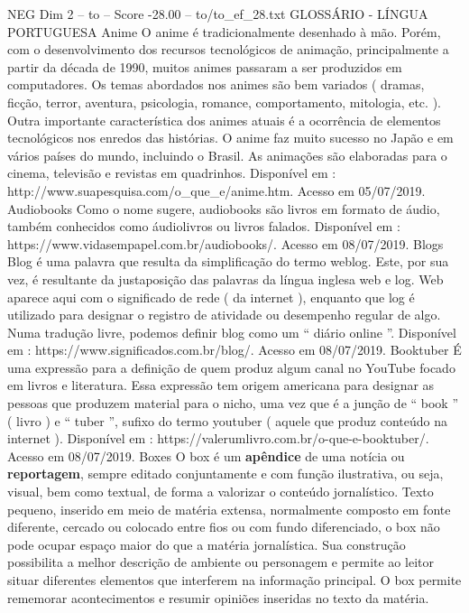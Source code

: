 \begin{textsample}{NEG Dim 2 – to – Score -28.00 – to/to\_ef\_28.txt}  \label{ex:f2_neg_151}
GLOSSÁRIO - LÍNGUA PORTUGUESA Anime O anime é tradicionalmente desenhado à mão.
Porém, com o desenvolvimento dos recursos tecnológicos de animação, principalmente a partir da década de 1990, muitos animes passaram a ser produzidos em computadores.
Os temas abordados nos animes são bem variados ( dramas, ficção, terror, aventura, psicologia, romance, comportamento, mitologia, etc. ).
Outra importante característica dos animes atuais é a ocorrência de elementos tecnológicos nos enredos das histórias.
O anime faz muito sucesso no Japão e em vários países do mundo, incluindo o Brasil.
As animações são elaboradas para o cinema, televisão e revistas em quadrinhos.
Disponível em : http://www.suapesquisa.com/o\_que\_e/anime.htm.
Acesso em 05/07/2019.
Audiobooks Como o nome sugere, audiobooks são livros em formato de áudio, também conhecidos como áudiolivros ou livros falados.
Disponível em : https://www.vidasempapel.com.br/audiobooks/.
Acesso em 08/07/2019.
Blogs Blog é uma palavra que resulta da simplificação do termo weblog.
Este, por sua vez, é resultante da justaposição das palavras da língua inglesa web e log.
Web aparece aqui com o significado de rede ( da internet ), enquanto que log é utilizado para designar o registro de atividade ou desempenho regular de algo.
Numa tradução livre, podemos definir blog como um “ diário online ”.
Disponível em : https://www.significados.com.br/blog/.
Acesso em 08/07/2019.
Booktuber É uma expressão para a definição de quem produz algum canal no YouTube focado em livros e literatura.
Essa expressão tem origem americana para designar as pessoas que produzem material para o nicho, uma vez que é a junção de “ book ” ( livro ) e “ tuber ”, sufixo do termo youtuber ( aquele que produz conteúdo na internet ).
Disponível em : https://valerumlivro.com.br/o-que-e-booktuber/.
Acesso em 08/07/2019.
Boxes O box é um \textbf{apêndice} de uma notícia ou \textbf{reportagem}, sempre editado conjuntamente e com função ilustrativa, ou seja, visual, bem como textual, de forma a valorizar o conteúdo jornalístico.
Texto pequeno, inserido em meio de matéria extensa, normalmente composto em fonte diferente, cercado ou colocado entre fios ou com fundo diferenciado, o box não pode ocupar espaço maior do que a matéria jornalística.
Sua construção possibilita a melhor descrição de ambiente ou personagem e permite ao leitor situar diferentes elementos que interferem na informação principal.
O box permite rememorar acontecimentos e resumir opiniões inseridas no texto da matéria.

\end{textsample}
